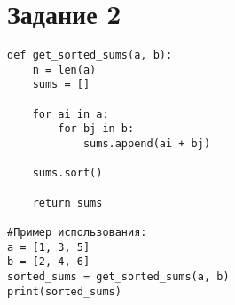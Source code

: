
\section*{Задание 2}


\begin{verbatim}
def get_sorted_sums(a, b):
    n = len(a)
    sums = []
    
    for ai in a:
        for bj in b:
            sums.append(ai + bj)
    
    sums.sort()
    
    return sums
            
#Пример использования:
a = [1, 3, 5]
b = [2, 4, 6]
sorted_sums = get_sorted_sums(a, b)
print(sorted_sums)
\end{verbatim}
